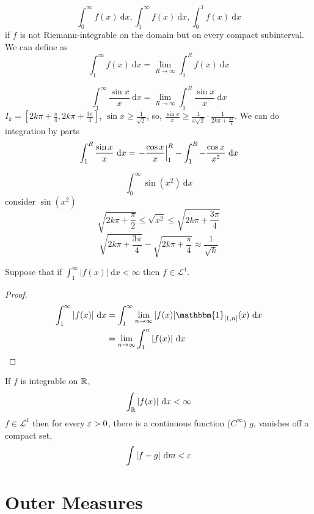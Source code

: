 \begin{definition}
  \[\int_0^\infty f(x)\ \mathrm{d}x, \int_1^\infty f(x)\ \mathrm{d}x, \int_0^1 f(x)\ \mathrm{d}x\]
  if $f$ is not Riemann-integrable on the domain but on every compact subinterval.
  We can define as
  \[\int_1^\infty f(x)\ \mathrm{d}x = \lim_{R\to\infty}\int_1^Rf(x) \ \mathrm{d}x\]

\end{definition}
\begin{example}
  \[\int_1^\infty \frac{\sin x}{x}\ \mathrm{d}x = \lim_{R\to\infty}\int_1^R\frac{\sin x}x \ \mathrm{d}x\]
  $I_k = [2k\pi + \frac\pi4, 2k\pi + \frac{3\pi}4]$, $\sin x \ge \frac1{\sqrt2}$, so, $\frac{\sin x}{x} \ge \frac1{x\sqrt2}\cdot \frac{1}{2k\pi + \frac{3\pi}4}$.
  We can do integration by parts
  $$
    \int_1^R \frac{\sin x}x \ \mathrm{d}x = \left.-\frac{\cos x}x\right|_1^R - \int_1^R -\frac{\cos x}{x^2} \ \mathrm{d}x \\
  $$
\end{example}

\begin{example}
  \[\int_0^\infty \sin(x^2)\ \mathrm{d}x\]
  consider $\sin(x^2)$
  \[
    \sqrt{2k\pi + \frac\pi2} \le \sqrt{x^2} \le \sqrt{2k\pi + \frac{3\pi}4} 
  \]
  \[\sqrt{2k\pi + \frac{3\pi}4} - \sqrt{2k\pi + \frac{\pi}4} \approx \frac1{\sqrt{k}}\]
\end{example}

\begin{lemma}
  Suppose that if $\int_1^\infty |f(x)|\ \mathrm{d}x < \infty$ then $f\in \mathcal{L}^1$.
\end{lemma}
\begin{proof}
  \begin{align*}
    \int_1^\infty |f(x)|\ \mathrm{d}x &= \int_1^\infty \lim_{n\to\infty}|f(x)|\mathbbm{1}_{[1, n]}(x)\ \mathrm{d}x \\
    &= \lim_{n\to\infty}\int_1^n |f(x)|\ \mathrm{d}x
  \end{align*}
\end{proof}

\begin{theorem}
  If $f$ is integrable on $\mathbb R$, $$\int_\mathbb R |f(x)|\ \mathrm{d}x < \infty$$ $f \in \mathcal{L}^1$ 
  then for every $\varepsilon > 0$, there is a continuous function ($C^\infty$) $g$, vanishes off a compact set, 
  \[\int |f - g| \ \mathrm{d}m < \eps\]
\end{theorem}

\section{Outer Measures}

